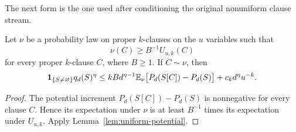 The next form is the one used after conditioning the original nonuniform
clause stream.

\begin{lemma}
\label{lem:robust-potential}
Let $\nu$ be a probability law on proper $k$-clauses on the $u$ variables
such that
\[
    \nu(C)\ge B^{-1}U_{u,k}(C)
\]
for every proper $k$-clause $C$, where $B\ge1$.  If $C\sim\nu$, then
\begin{equation}
    \mathbf 1_{\{S\ne\varnothing\}}q_d(S)^\eta
    \le
    kB d^{\eta-1}
      \mathbb E_\nu\bigl[P_d(S[C])-P_d(S)\bigr]
    +c_k d^\eta u^{-k}.
    \label{eq:robust-potential-drift}
\end{equation}
\end{lemma}

\begin{proof}
The potential increment $P_d(S[C])-P_d(S)$ is nonnegative for every clause
$C$.  Hence its expectation under $\nu$ is at least $B^{-1}$ times its
expectation under $U_{u,k}$.  Apply
Lemma~\ref{lem:uniform-potential}.
\end{proof}
